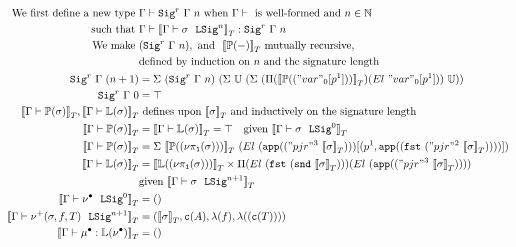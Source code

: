 \begin{align*}
  \text{We first define a new type }& \goodType{\Gamma}{\Sigr{\Gamma}{n}}{}  \text{ when } \goodCtx{\Gamma}{}  \text{ is well-formed and } n \in \mathbb{N} \\
  \text{such that } &\goodTerm{\Gm}{\denotesT{\goodSig{\Gamma}{\lsig}{n}}}{\Sigr{\Gm}{n}} \\
  \text{We make } & ({\Sigr{\Gamma}{n}}), \text{ and } \ \denotesT{\TyTkg {-}} \text{ mutually recursive, } \\
  & \text{defined by induction on $n$ and the signature length} \\  
  {\Sigr{\Gamma}{(n+1)}} &= 
    \Sigma~(\Sigr{\Gamma}{n})
          ~(\Sigma~\cU
                  ~(\Sigma~(\Pi(\denotesT{\TyTkg {("var"_0[p^1])}})(El~"var"_0[p^1]))~\cU)) \\
  \Sigr{\Gamma}{0} &= \top \\
  \denotesT{\goodType{\Gamma}{\TyTkg {\sigma}}{}}, \denotesT{\goodType{\Gamma}{\TyLkg{\sigma}}{}} &\text{ defines upon } \denotesT{\sigma} 
  \text{ and inductively on the signature length} \\
  \denotesT{\goodType{\Gamma}{\TyTkg {\sigma}}{}} &= \denotesT{\goodType{\Gamma}{\TyLkg{\sigma}}{}} = \top \quad
      \text{given } \denotesT{\goodSig{\Gamma}{\sigma}{0}} \\ 
  \denotesT{\goodType{\Gamma}{\TyTkg {\sigma}}{}} &= 
    \Sigma~\denotesT{\TyTkg {(\lsigproj{1}{\sigma})}}~(El \ (\app{("pjr"^3~\denotesT{\sigma})})[(p^1, \app{(\fst{("pjr"^2~{\denotesT{\sigma}})})})]) \\
  \denotesT{\goodType{\Gamma}{\TyLkg{\sigma}}{}} &=
  \denotesT{\TyLkg{(\lsigproj{1}{\sigma})}} \times \Pi(El~(\fst{(\snd{\denotesT{\sigma}})}))(El~(\app{("pjr"^3~\denotesT{\sigma})} )) \\
  &\text{given } \denotesT{\goodSig{\Gamma}{\sigma}{n+1}} \\
  \denotesT{\goodSig{\Gamma}{\LSigEmp}{0}} &= \unit \\ 
  \denotesT{\goodSig{\Gamma}{\LSigAdd{\sigma}{f}{T}}{n+1}} &= (\denotesT{\sigma}, \codety{A}, \lam{f}, \lam{(\codety{T})}) \\ 
  \denotesT{\goodTerm{\Gamma}{\LkgEmp}{\TyLkg{\LSigEmp}}} &= \unit \\ 

\end{align*}
